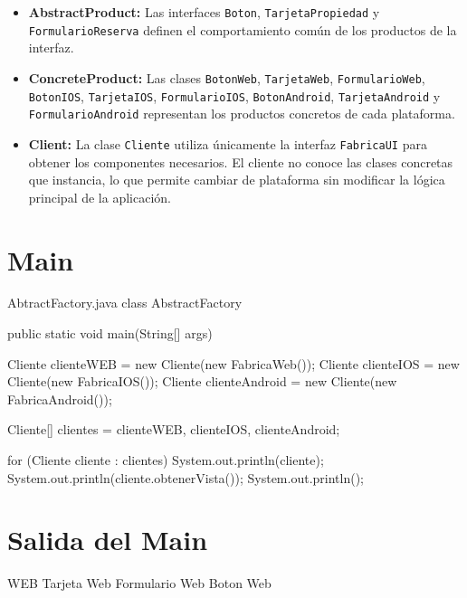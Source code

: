\begin{itemize}
\begin{itemize}
    \item \textbf{AbstractProduct:}  
    Las interfaces \texttt{Boton}, \texttt{TarjetaPropiedad} y
    \texttt{FormularioReserva} definen el comportamiento común de los
    productos de la interfaz.

    \item \textbf{ConcreteProduct:}  
    Las clases \texttt{BotonWeb}, \texttt{TarjetaWeb},
    \texttt{FormularioWeb}, \texttt{BotonIOS}, \texttt{TarjetaIOS},
    \texttt{FormularioIOS}, \texttt{BotonAndroid},
    \texttt{TarjetaAndroid} y \texttt{FormularioAndroid} representan los
    productos concretos de cada plataforma.

    \item \textbf{Client:}  
    La clase \texttt{Cliente} utiliza únicamente la interfaz
    \texttt{FabricaUI} para obtener los componentes necesarios. El cliente no
    conoce las clases concretas que instancia, lo que permite cambiar de
    plataforma sin modificar la lógica principal de la aplicación.
\end{itemize}


\section{Main}

\begin{codigof}{AbtractFactory.java}
class AbstractFactory {
    public static void main(String[] args) {
        Cliente clienteWEB = new Cliente(new FabricaWeb());
        Cliente clienteIOS = new Cliente(new FabricaIOS());
        Cliente clienteAndroid = new Cliente(new FabricaAndroid());

        Cliente[] clientes = {clienteWEB, clienteIOS, clienteAndroid};

        for (Cliente cliente : clientes) {
            System.out.println(cliente);
            System.out.println(cliente.obtenerVista());
            System.out.println();
        }
    }
}

\end{codigof}


\section{Salida del Main}

\begin{salida}
WEB
Tarjeta Web
Formulario Web
Boton Web


\end{salida}
\end{itemize}
